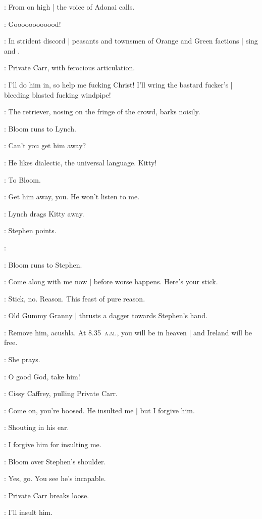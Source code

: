 :
From on high |
the voice of Adonai calls.

\Adonai:
Goooooooooood!

:
In strident discord |
peasants and townsmen of Orange and Green factions |
sing 
and .

:
Private Carr,
with ferocious articulation.

\Carr:
I'll do him in,
so help me fucking Christ!
I'll wring the bastard fucker's |
bleeding blasted fucking windpipe!

:
The retriever,
nosing on the fringe of the crowd,
barks noisily.

:
Bloom runs to Lynch.

\Bloom:
Can't you get him away?

\Lynch:
He likes dialectic,
the universal language.
Kitty!

:
To Bloom.

\Lynch:
Get him away,
you.
He won't listen to me.

:
Lynch drags Kitty away.

:
Stephen points.

\Stephen:

:
Bloom runs to Stephen.

\Bloom:
Come along with me now |
before worse happens.
Here's your stick.

\Stephen:
Stick,
no.
Reason.
This feast of pure reason.

:
Old Gummy Granny |
thrusts a dagger towards Stephen's hand.

\GummyGranny:
Remove him,
acushla.
At 8.35~\textsc{a.m.},
you will be in heaven |
and Ireland will be free.

:
She prays.

\GummyGranny:
O good God,
take him!

:
Cissy Caffrey,
pulling Private Carr.

\Cissy:
Come on,
you're boosed.
He insulted me |
but I forgive him.

:
Shouting in his ear.

\Cissy:
I forgive him for insulting me.

:
Bloom over Stephen's shoulder.

\Bloom:
Yes,
go.
You see he's incapable.

:
Private Carr breaks loose.

\Carr:
I'll insult him.

